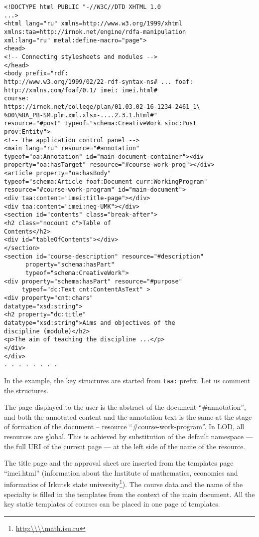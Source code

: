 \documentclass[12pt]{llncs}
\begin{document}
\begingroup\normalsize
\begin{verbatim}
<!DOCTYPE html PUBLIC "-//W3C//DTD XHTML 1.0 
...>
<html lang="ru" xmlns=http://www.w3.org/1999/xhtml
xmlns:taa=http://irnok.net/engine/rdfa-manipulation 
xml:lang="ru" metal:define-macro="page">
<head> 
<!-- Connecting stylesheets and modules -->
</head>
<body prefix="rdf:
http://www.w3.org/1999/02/22-rdf-syntax-ns# ... foaf:
http://xmlns.com/foaf/0.1/ imei: imei.html#
course:
https://irnok.net/college/plan/01.03.02-16-1234-2461_1\
%D0\%BA_PB-SM.plm.xml.xlsx-....2.3.1.html#"
resource="#post" typeof="schema:CreativeWork sioc:Post
prov:Entity">
<!-- The application control panel -->
<main lang="ru" resource="#annotation"
typeof="oa:Annotation" id="main-document-container"><div
property="oa:hasTarget" resource="#course-work-prog"></div>
<article property="oa:hasBody"
typeof="schema:Article foaf:Document curr:WorkingProgram"
resource="#course-work-program" id="main-document">
<div taa:content="imei:title-page"></div>
<div taa:content="imei:neg-UMK"></div>
<section id="contents" class="break-after">
<h2 class="nocount c">Table of
Contents</h2>
<div id="tableOfContents"></div>
</section>
<section id="course-description" resource="#description"
      property="schema:hasPart"
      typeof="schema:CreativeWork">
<div property="schema:hasPart" resource="#purpose"
     typeof="dc:Text cnt:ContentAsText" >
<div property="cnt:chars"
datatype="xsd:string">
<h2 property="dc:title"
datatype="xsd:string">Aims and objectives of the 
discipline (module)</h2>
<p>The aim of teaching the discipline ...</p>
</div>
</div>
. . . . . . . .
\end{verbatim}
\endgroup

In the example, the key structures are started from \texttt{taa:} prefix. Let us
comment the structures.

The page displayed to the user is the abstract of the document
``\#annotation'', and both the annotated content and the annotation text
is the same at the stage of formation of the document -- resource
``\#course-work-program''. In LOD, all resources are global. This is
achieved by substitution of the default namespace --- the full URI of the
current page --- at the left side of the name of the resource.

The title page and the approval sheet are inserted from the templates
page ``imei.html'' (information about the Institute of mathematics,
economics and informatics of Irkutsk state university\footnote{\url{http:\\\\math.isu.ru}}).
The course data and the name of the specialty is filled in the templates
from the context of the main document. All the key static templates of
courses can be placed in one page of templates.
\end{document}
